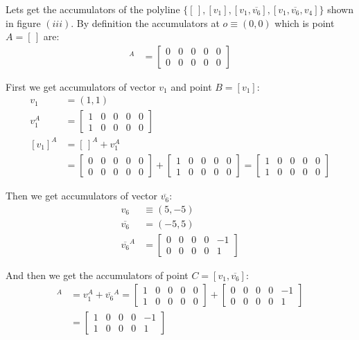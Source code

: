 \documentclass[11pt]{article}
\begin{document}
Lets get the accumulators of the polyline $\{[\hspace{2pt}], [v_1], [v_1,\overline{v_6}], [v_1,\overline{v_6},v_4]\}$ shown in figure $(iii)$. By definition the accumulators at $o \equiv (0,0)$ which is point $A=[\hspace{2pt}]$ are:
\begin{align}
[\hspace{2pt}]^A &= \left[\begin{array}{ccccc}0&0&0&0&0 \\ 0&0&0&0&0 \end{array}\right]
\end{align}

First we get accumulators of vector $v_1$ and point $B=[v_1]$:
\begin{align}
v_1 &= (1,1) \nonumber\\
v_1^A &= \left[\begin{array}{ccccc}1&0&0&0&0 \\ 1&0&0&0&0 \end{array}\right]\\
[v_1]^A &= [\hspace{2pt}]^A + v_1^A\\
 &= \left[\begin{array}{ccccc}0&0&0&0&0 \\ 0&0&0&0&0 \end{array}\right]
 + \left[\begin{array}{ccccc}1&0&0&0&0 \\ 1&0&0&0&0 \end{array}\right]
 = \left[\begin{array}{ccccc}1&0&0&0&0 \\ 1&0&0&0&0 \end{array}\right]
\end{align}

Then we get accumulators of vector $\overline{v_6}$:
\begin{align}
v_6 &\equiv (5,-5)\nonumber\\
\overline{v_6} &= (-5,5)\nonumber\\
\overline{v_6}^A &= \left[\begin{array}{ccccc}0&0&0&0&-1 \\ 0&0&0&0&1 \end{array}\right]
\end{align}

And then we get the accumulators of point $C=[v_1,\overline{v_6}]$:
\begin{align}
[v_1, \overline{v_6}]^A &= v_1^A + \overline{v_6}^A
 = \left[\begin{array}{ccccc}1&0&0&0&0 \\ 1&0&0&0&0 \end{array}\right] +
 \left[\begin{array}{ccccc}0&0&0&0&-1 \\ 0&0&0&0&1 \end{array}\right]\\
 &= \left[\begin{array}{ccccc}1&0&0&0&-1 \\ 1&0&0&0&1 \end{array}\right]
\end{align}
\end{document}
